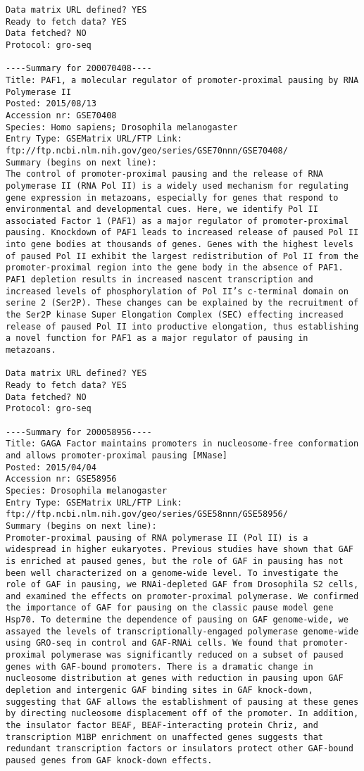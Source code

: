 \documentclass[12pt,letterpaper]{article}
\begin{document}
\begin{verbatim}
Data matrix URL defined? YES
Ready to fetch data? YES
Data fetched? NO
Protocol: gro-seq

----Summary for 200070408----
Title: PAF1, a molecular regulator of promoter-proximal pausing by RNA Polymerase II
Posted: 2015/08/13
Accession nr: GSE70408
Species: Homo sapiens; Drosophila melanogaster
Entry Type: GSEMatrix URL/FTP Link: ftp://ftp.ncbi.nlm.nih.gov/geo/series/GSE70nnn/GSE70408/
Summary (begins on next line):
The control of promoter-proximal pausing and the release of RNA polymerase II (RNA Pol II) is a widely used mechanism for regulating gene expression in metazoans, especially for genes that respond to environmental and developmental cues. Here, we identify Pol II associated Factor 1 (PAF1) as a major regulator of promoter-proximal pausing. Knockdown of PAF1 leads to increased release of paused Pol II into gene bodies at thousands of genes. Genes with the highest levels of paused Pol II exhibit the largest redistribution of Pol II from the promoter-proximal region into the gene body in the absence of PAF1. PAF1 depletion results in increased nascent transcription and increased levels of phosphorylation of Pol II’s c-terminal domain on serine 2 (Ser2P). These changes can be explained by the recruitment of the Ser2P kinase Super Elongation Complex (SEC) effecting increased release of paused Pol II into productive elongation, thus establishing a novel function for PAF1 as a major regulator of pausing in metazoans.

Data matrix URL defined? YES
Ready to fetch data? YES
Data fetched? NO
Protocol: gro-seq

----Summary for 200058956----
Title: GAGA Factor maintains promoters in nucleosome-free conformation and allows promoter-proximal pausing [MNase]
Posted: 2015/04/04
Accession nr: GSE58956
Species: Drosophila melanogaster
Entry Type: GSEMatrix URL/FTP Link: ftp://ftp.ncbi.nlm.nih.gov/geo/series/GSE58nnn/GSE58956/
Summary (begins on next line):
Promoter-proximal pausing of RNA polymerase II (Pol II) is a widespread in higher eukaryotes. Previous studies have shown that GAF is enriched at paused genes, but the role of GAF in pausing has not been well characterized on a genome-wide level. To investigate the role of GAF in pausing, we RNAi-depleted GAF from Drosophila S2 cells, and examined the effects on promoter-proximal polymerase. We confirmed the importance of GAF for pausing on the classic pause model gene Hsp70. To determine the dependence of pausing on GAF genome-wide, we assayed the levels of transcriptionally-engaged polymerase genome-wide using GRO-seq in control and GAF-RNAi cells. We found that promoter-proximal polymerase was significantly reduced on a subset of paused genes with GAF-bound promoters. There is a dramatic change in nucleosome distribution at genes with reduction in pausing upon GAF depletion and intergenic GAF binding sites in GAF knock-down, suggesting that GAF allows the establishment of pausing at these genes by directing nucleosome displacement off of the promoter. In addition, the insulator factor BEAF, BEAF-interacting protein Chriz, and transcription M1BP enrichment on unaffected genes suggests that redundant transcription factors or insulators protect other GAF-bound paused genes from GAF knock-down effects.


\end{verbatim}
\end{document}
